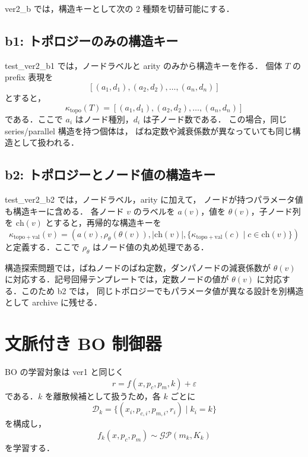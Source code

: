 \documentclass[a4paper,11pt]{ltjsarticle}
\begin{document}
ver2\_b では，構造キーとして次の 2 種類を切替可能にする．

\subsection{b1: トポロジーのみの構造キー}

test\_ver2\_b1 では，ノードラベルと arity のみから構造キーを作る．
個体 \(T\) の prefix 表現を
\begin{equation}
\left[
(a_1,d_1),
(a_2,d_2),
\dots,
(a_n,d_n)
\right]
\end{equation}
とすると，
\begin{equation}
\kappa_{\mathrm{topo}}(T)
=
\left[
(a_1,d_1),
(a_2,d_2),
\dots,
(a_n,d_n)
\right]
\end{equation}
である．ここで \(a_i\) はノード種別，\(d_i\) は子ノード数である．
この場合，同じ series/parallel 構造を持つ個体は，
ばね定数や減衰係数が異なっていても同じ構造として扱われる．

\subsection{b2: トポロジーとノード値の構造キー}

test\_ver2\_b2 では，ノードラベル，arity に加えて，
ノードが持つパラメータ値も構造キーに含める．
各ノード \(v\) のラベルを \(a(v)\)，値を \(\theta(v)\)，子ノード列を
\(\mathrm{ch}(v)\) とすると，再帰的な構造キーを
\begin{equation}
\kappa_{\mathrm{topo+val}}(v)
=
\left(
a(v),
\rho_\theta(\theta(v)),
|\mathrm{ch}(v)|,
\{\kappa_{\mathrm{topo+val}}(c)\mid c\in \mathrm{ch}(v)\}
\right)
\end{equation}
と定義する．ここで \(\rho_\theta\) はノード値の丸め処理である．

構造探索問題では，ばねノードのばね定数，ダンパノードの減衰係数が
\(\theta(v)\) に対応する．記号回帰テンプレートでは，定数ノードの値が
\(\theta(v)\) に対応する．このため b2 では，
同じトポロジーでもパラメータ値が異なる設計を別構造として archive に残せる．

\section{文脈付き BO 制御器}

BO の学習対象は ver1 と同じく
\begin{equation}
r=f(x,p_c,p_m,k)+\varepsilon
\end{equation}
である．\(k\) を離散候補として扱うため，各 \(k\) ごとに
\begin{equation}
\mathcal{D}_k
=
\{(x_i,p_{c,i},p_{m,i},r_i)\mid k_i=k\}
\end{equation}
を構成し，
\begin{equation}
f_k(x,p_c,p_m)\sim\mathcal{GP}(m_k,K_k)
\end{equation}
を学習する．
\end{document}
